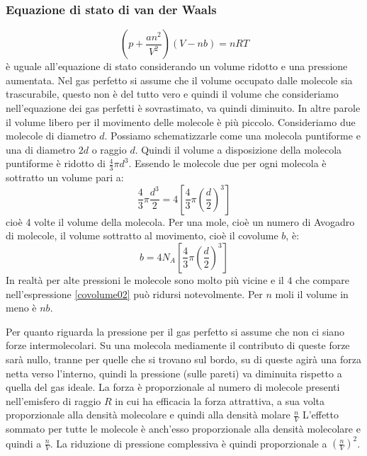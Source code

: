 \subsubsection{Equazione di stato di van der Waals}
\begin{equation}
	\left(p+\frac{an^2}{V^2}\right)(V-nb)=nRT
\end{equation}
è uguale all'equazione di stato considerando un volume ridotto e una pressione aumentata. Nel gas perfetto si assume che il volume occupato dalle molecole sia trascurabile, questo non è del tutto vero e quindi il volume che consideriamo nell'equazione dei gas perfetti è sovrastimato, va quindi diminuito. In altre parole il volume libero per il movimento delle molecole è più piccolo. Consideriamo due molecole di diametro $d$. Possiamo schematizzarle come una molecola puntiforme e una di diametro $2d$ o raggio $d$. Quindi il volume a disposizione della molecola puntiforme è ridotto di $\frac{4}{3}\pi d^3$. Essendo le molecole due per ogni molecola è sottratto un volume pari a:
\begin{equation}
	\frac{4}{3}\pi\frac{d^3}{2}=4\left[\frac{4}{3}\pi\left(\frac{d}{2}\right)^3\right]
\end{equation}
cioè 4 volte il volume della molecola. Per una mole, cioè un numero di Avogadro di molecole, il volume sottratto al movimento, cioè il covolume $b$, è:
\begin{equation}
	b=4N_A\left[\frac{4}{3}\pi\left(\frac{d}{2}\right)^3\right]
	\label{covolume02}
\end{equation}
In realtà per alte pressioni le molecole sono molto più vicine e il $4$ che compare nell'espressione \eqref{covolume02} può ridursi notevolmente. Per $n$ moli il volume in meno è $nb$.

Per quanto riguarda la pressione per il gas perfetto si assume che non ci siano forze intermolecolari. Su una molecola mediamente il contributo di queste forze sarà nullo, tranne per quelle che si trovano sul bordo, su di queste agirà una forza netta verso l'interno, quindi la pressione (sulle pareti) va diminuita rispetto a quella del gas ideale. La forza è proporzionale al numero di molecole presenti nell'emisfero di raggio $R$ in cui ha efficacia la forza attrattiva, a sua volta proporzionale alla densità molecolare e quindi alla densità molare $\frac{n}{V}$ L'effetto sommato per tutte le molecole è anch'esso proporzionale alla densità molecolare e quindi a $\frac{n}{V}$. La riduzione di pressione complessiva è quindi proporzionale a $\left(\frac{n}{V}\right)^2$.
